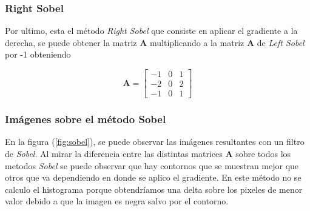 \subsubsection{Right Sobel}

Por ultimo, esta el método \textit{Right Sobel} que consiste en aplicar el gradiente a la derecha, se puede obtener la matriz \textbf{A} multiplicando a la matriz \textbf{A} de \textit{Left Sobel} por -1 obteniendo

\begin{equation}
\textbf{A}=\begin{bmatrix}
-1 &0 &1\\
-2 &0 &2\\
-1 &0 &1
\end{bmatrix}
\end{equation}


\subsubsection{Imágenes sobre el método Sobel}

	En la figura (\ref{fig:sobel}), se puede observar las imágenes resultantes con un filtro de \textit{Sobel}.  Al mirar la diferencia entre las distintas matrices \textbf{A} sobre todos los metodos \textit{Sobel} se puede observar que hay contornos que se muestran mejor que otros que va dependiendo en donde se aplico el gradiente. En este método no se calculo el histograma porque obtendríamos una delta sobre los pixeles de menor valor debido a que la imagen es negra salvo por el contorno.

